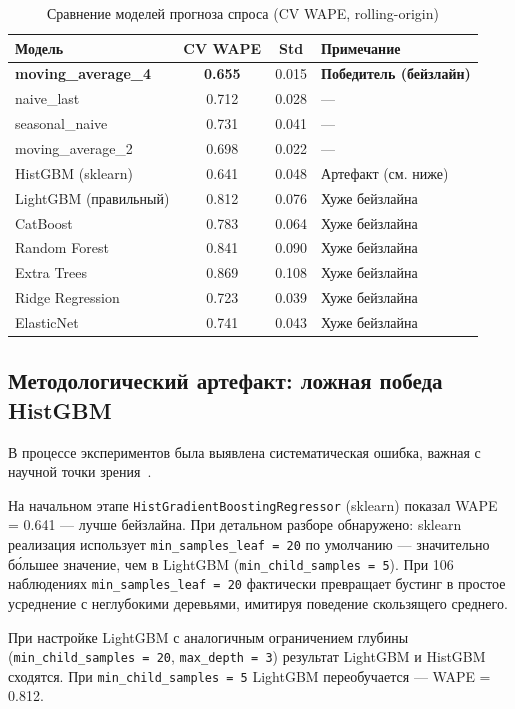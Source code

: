 \begin{table}[H]
\centering
\caption{Сравнение моделей прогноза спроса (CV WAPE, rolling-origin)}
\label{tab:demand_experiments}
\begin{tabular}{lccl}
\toprule
\textbf{Модель} & \textbf{CV WAPE} & \textbf{Std} & \textbf{Примечание} \\
\midrule
\textbf{moving\_average\_4} & \textbf{0.655} & 0.015 & \textbf{Победитель (бейзлайн)} \\
naive\_last & 0.712 & 0.028 & --- \\
seasonal\_naive & 0.731 & 0.041 & --- \\
moving\_average\_2 & 0.698 & 0.022 & --- \\
\midrule
HistGBM (sklearn) & 0.641 & 0.048 & Артефакт (см. ниже) \\
LightGBM (правильный) & 0.812 & 0.076 & Хуже бейзлайна \\
CatBoost & 0.783 & 0.064 & Хуже бейзлайна \\
Random Forest & 0.841 & 0.090 & Хуже бейзлайна \\
Extra Trees & 0.869 & 0.108 & Хуже бейзлайна \\
Ridge Regression & 0.723 & 0.039 & Хуже бейзлайна \\
ElasticNet & 0.741 & 0.043 & Хуже бейзлайна \\
\bottomrule
\end{tabular}
\end{table}

\subsection{Методологический артефакт: ложная победа HistGBM}

В процессе экспериментов была выявлена систематическая ошибка, важная с научной точки зрения~\cite{sculley2015hidden}.

На начальном этапе \texttt{HistGradientBoostingRegressor} (sklearn) показал WAPE = 0.641 --- лучше бейзлайна. При детальном разборе обнаружено: sklearn реализация использует \texttt{min\_samples\_leaf~=~20} по умолчанию --- значительно бо́льшее значение, чем в LightGBM (\texttt{min\_child\_samples~=~5}). При 106 наблюдениях \texttt{min\_samples\_leaf~=~20} фактически превращает бустинг в простое усреднение с неглубокими деревьями, имитируя поведение скользящего среднего.

При настройке LightGBM с аналогичным ограничением глубины (\texttt{min\_child\_samples~=~20}, \texttt{max\_depth~=~3}) результат LightGBM и HistGBM сходятся. При \texttt{min\_child\_samples~=~5} LightGBM переобучается --- WAPE = 0.812.

